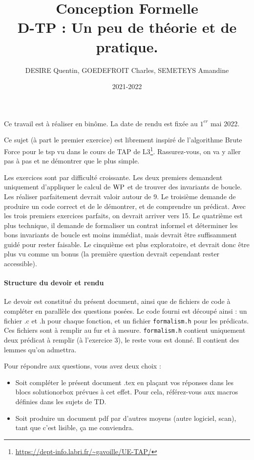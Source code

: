 \documentclass[11pt,answers]{exam}
\author{DESIRE Quentin, GOEDEFROIT Charles, SEMETEYS Amandine}
\date{2021-2022}
\title{{\bf Conception Formelle} \texorpdfstring{\\} TD-TP : Un peu de théorie et de pratique.}
\begin{document}
\maketitle

Ce travail est à réaliser en binôme. La date de rendu est fixée au $1^{er}$ mai 2022.

Ce sujet (à part le premier exercice) est librement inspiré de l’algorithme Brute Force pour le tsp vu dans le cours de TAP de L3\footnote{\url{https://dept-info.labri.fr/~gavoille/UE-TAP/}}.
Rassurez-vous, on va y aller pas à pas et ne démontrer que le plus simple.

Les exercices sont par difficulté croissante. Les deux premiers demandent uniquement d’appliquer le calcul de $\mathrm{WP}$ et de trouver des invariants de boucle.
Les réaliser parfaitement devrait valoir autour de 9.
Le troisième demande de produire un code correct et de le démontrer, et de comprendre un prédicat. Avec les trois premiers exercices parfaits, on devrait arriver vers 15.
Le quatrième est plus technique, il demande de formaliser un contrat informel et déterminer les bons invariants de boucle est moins immédiat, mais devrait être suffisamment guidé pour rester faisable.
Le cinquième est plus exploratoire, et devrait donc être plus vu comme un bonus (la première question devrait cependant rester accessible).

\paragraph{Structure du devoir et rendu}

Le devoir est constitué du présent document, ainsi que de fichiers de code à compléter en parallèle des questions posées.
Le code fourni est découpé ainsi : un fichier .c et .h pour chaque fonction, et 
un fichier \texttt{formalism.h} pour les prédicats.
Ces fichiers sont à remplir au fur et à mesure. \texttt{formalism.h} contient uniquement deux prédicat à remplir (à l’exercice 3), le reste vous est donné. Il contient des lemmes qu’on admettra.

Pour répondre aux questions, vous avez deux choix :
\begin{itemize}
    \item Soit compléter le présent document .tex en plaçant vos réponses dans les blocs solutionorbox prévues à cet effet. Pour cela, référez-vous aux macros définies dans les sujets de TD.
    \item Soit produire un document pdf par d’autres moyens (autre logiciel, scan), tant que c’est lisible, ça me conviendra.
\end{itemize}
\end{document}
